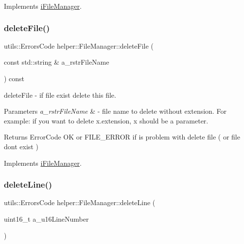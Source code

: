 Implements \mbox{\hyperlink{classi_file_manager}{i\+File\+Manager}}.

\mbox{\label{classhelper_1_1_file_manager_aa1bc4e046b1975d24ac2b8d575792692}} 
\subsubsection{\texorpdfstring{deleteFile()}{deleteFile()}}
{\footnotesize\ttfamily utils\+::\+Errors\+Code helper\+::\+File\+Manager\+::delete\+File (\begin{DoxyParamCaption}\item[{const std\+::string \&}]{a\+\_\+rstr\+File\+Name }\end{DoxyParamCaption}) const\hspace{0.3cm}{\ttfamily [virtual]}}



delete\+File -\/ if file exist delete this file. 


\begin{DoxyParams}{Parameters}
{\em a\+\_\+rstr\+File\+Name} & -\/ file name to delete without extension. For example\+: if you want to delete x.\+extension, x should be a parameter. \\
\hline
\end{DoxyParams}
\begin{DoxyReturn}{Returns}
Error\+Code OK or F\+I\+L\+E\+\_\+\+E\+R\+R\+OR if is problem with delete file ( or file dont exist ) 
\end{DoxyReturn}


Implements \mbox{\hyperlink{classi_file_manager}{i\+File\+Manager}}.

\mbox{\label{classhelper_1_1_file_manager_a6b2ed7ad49524905359d08d5c95dc774}} 
\subsubsection{\texorpdfstring{deleteLine()}{deleteLine()}}
{\footnotesize\ttfamily utils\+::\+Errors\+Code helper\+::\+File\+Manager\+::delete\+Line (\begin{DoxyParamCaption}\item[{uint16\+\_\+t}]{a\+\_\+u16\+Line\+Number }\end{DoxyParamCaption})\hspace{0.3cm}{\ttfamily [virtual]}}



